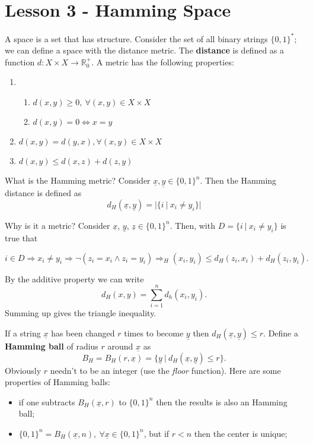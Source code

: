 \section{Lesson 3 - Hamming Space}

A space is a set that has structure. Consider the set of all binary strings $\{0, 1\}^*$; we can define a space with the distance metric. The \textbf{distance} is defined as a function $d: X \times X \rightarrow \mathbb{R}^+_0$. A metric has the following properties:
\begin{enumerate}
	\item \begin{enumerate}
		\item $d(x, y) \geq 0,\ \forall (x, y) \in X \times X$
		\item $d(x, y) = 0 \Leftrightarrow x = y$
	\end{enumerate}
	\item $d(x, y) = d(y, x), \forall (x, y) \in X \times X$
	\item $d(x, y) \leq d(x, z) + d(z, y)$
\end{enumerate}

What is the Hamming metric? Consider $\underline{x}, \underline{y}  \in \{0, 1\}^n$. Then the Hamming distance is defined as
\begin{equation}
	d_H(\underline{x},\underline{y}) = |\{i\ |\ x_i \not= y_i\}|
\end{equation}

Why is it a metric? Consider $\underline{x}$, $\underline{y}$, $\underline{z} \in \{0,1\}^n$. Then, with $D = \{i\ |\ x_i \not= y_i\}$ is true that 
\begin{center}
	\begin{math}i \in D \Rightarrow x_i \not=y_i \Rightarrow \neg (z_i = x_i \wedge z_i = y_i) \Rightarrow _H(x_i, y_i) \leq d_H(z_i, x_i) + d_H(z_i, y_i).
	\end{math}
\end{center}

By the additive property we can write $$d_H(x, y) = \sum_{i = 1}^n d_h(x_i, y_i).$$ Summing up gives the triangle inequality.

If a string $\underline{x}$ has been changed $r$ times to become $\underline{y}$ then $d_H(\underline{x}, \underline{y}) \leq r$. Define a \textbf{Hamming ball} of radius $r$ around $\underline{x}$ as 
$$B_H=B_H(r, \underline{x}) = \{\underline{y}\ |\ d_H(\underline{x}, \underline{y}) \leq r\}.$$
Obviously $r$ needn't to be an integer (use the \emph{floor} function). Here are some properties of Hamming balls:
\begin{itemize}
	\item if one subtracts $B_H(\underline{x}, r)$ to $\{0, 1\}^n$ then the results is also an Hamming ball;
	\item $\{0, 1\}^n = B_H(\underline{x}, n),\ \forall \underline{x} \in \{0, 1\}^n$, but if $r < n$ then the center is unique;
\end{itemize}

